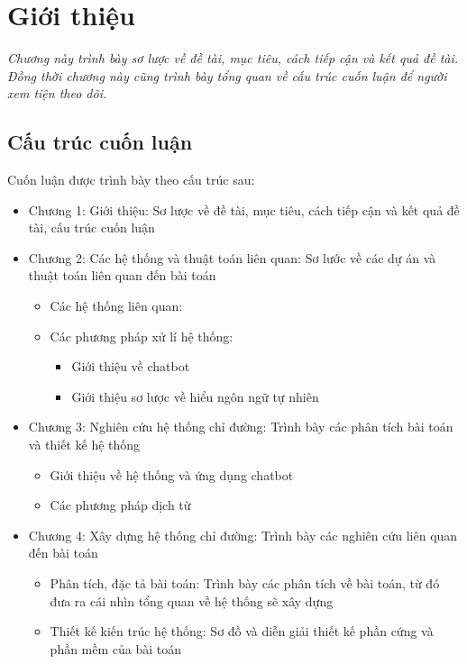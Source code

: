 \chapter{Giới thiệu}
\label{Chapter1}

\emph{Chương này trình bày sơ lược về đề tài, mục tiêu, cách tiếp cận và kết quả đề tài. Đồng thời chương này cũng trình bày tổng quan về cấu trúc cuốn luận để người xem tiện theo dõi.}
\section{Cấu trúc cuốn luận}
Cuốn luận được trình bày theo cấu trúc sau:
\begin{itemize}
    \item Chương 1: Giới thiệu: Sơ lược về đề tài, mục tiêu, cách tiếp cận và kết quả đề tài, cấu trúc cuốn luận
    \item Chương 2: Các hệ thống và thuật toán liên quan: Sơ lước về các dự án và thuật toán liên quan đến bài toán
          \begin{itemize}
              \item Các hệ thống liên quan:
              \item Các phương pháp xử lí hệ thống:
                    \begin{itemize}
                        \item Giới thiệu về chatbot
                        \item Giới thiệu sơ lược về hiểu ngôn ngữ tự nhiên
                    \end{itemize}
          \end{itemize}
    \item Chương 3: Nghiên cứu hệ thống chỉ đường: Trình bày các phân tích bài toán và thiết kế hệ thống
          \begin{itemize}
              \item Giới thiệu về hệ thống và ứng dụng chatbot
              \item Các phương pháp dịch từ
          \end{itemize}
    \item Chương 4: Xây dựng hệ thống chỉ đường: Trình bày các nghiên cứu liên quan đến bài toán
          \begin{itemize}
              \item Phân tích, đặc tả bài toán: Trình bày các phân tích về bài toán, từ đó đưa ra cái nhìn tổng quan về hệ thống sẽ xây dựng
              \item Thiết kế kiến trúc hệ thống: Sơ đồ và diễn giải thiết kế phần cứng và phần mềm của bài toán

\end{itemize}
\end{itemize}
